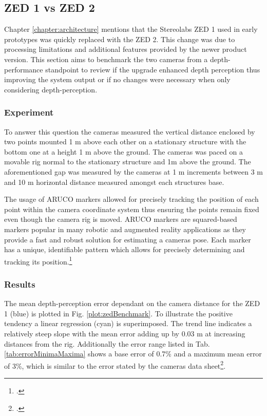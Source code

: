 \subsection{ZED 1 vs ZED 2}
Chapter \ref{chapter:architecture} mentions that the Stereolabs ZED 1 used in early prototypes was quickly replaced with the ZED 2. This change was due to processing limitations and additional features provided by the newer product version.
This section aims to benchmark the two cameras from a depth-performance standpoint to review if the upgrade enhanced depth perception thus improving the system output or if no changes were necessary when only considering depth-perception.

\subsubsection{Experiment}
To answer this question the cameras measured the vertical distance enclosed by two points mounted 1 m above each other on a stationary structure with the bottom one at a height 1 m above the ground. 
The cameras was paced on a movable rig normal to the stationary structure and 1m above the ground.  The aforementioned gap was measured by the cameras at 1 m increments between 3 m and 10 m horizontal distance measured amongst each structures base. 

The usage of ARUCO markers allowed for precisely tracking the position of each point within the camera coordinate system thus ensuring the points remain fixed even though the camera rig is moved. 
ARUCO markers are squared-based markers popular in many robotic and augmented reality applications as they provide a fast and robust solution for estimating a cameras pose. Each marker has a unique, identifiable pattern which allows for precisely determining and tracking its position.\footcite{jurado2015} 

\subsubsection{Results}

The mean depth-perception error dependant on the camera distance for the ZED 1 (blue) is plotted in Fig. \ref{plot:zedBenchmark}. To illustrate the positive tendency a linear regression (cyan) is superimposed. The trend line indicates a relatively steep slope with the mean error adding up by 0.03 m at increasing distances from the rig. Additionally the error range listed in Tab. \ref{tab:errorMinimaMaxima} shows a base error of 0.7\% and a maximum mean error of 3\%, which is similar to the error stated by the cameras data sheet\footcite{zed1Datasheet}.


